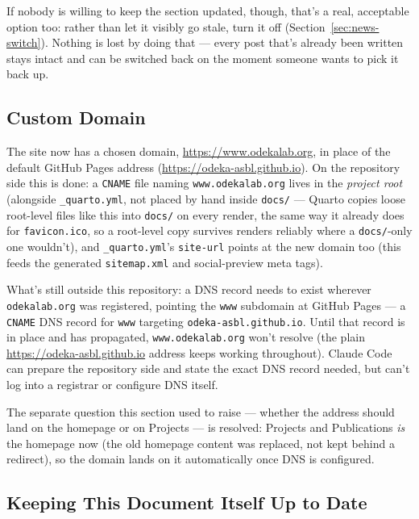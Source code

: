 \documentclass[11pt]{article}
\newcommand{\file}[1]{\texttt{#1}}
\newcommand{\cmd}[1]{\texttt{#1}}
\begin{document}
If nobody is willing to keep the section updated, though, that's a
real, acceptable option too: rather than let it visibly go stale,
turn it off (Section~\ref{sec:news-switch}). Nothing is lost by doing
that --- every post that's already been written stays intact and can be
switched back on the moment someone wants to pick it back up.

\subsection{Custom Domain}
\label{sec:domain-todo}

The site now has a chosen domain, \url{https://www.odekalab.org}, in
place of the default GitHub Pages address
(\url{https://odeka-asbl.github.io}). On the repository side this is
done: a \file{CNAME} file naming \file{www.odekalab.org} lives in the
\emph{project root} (alongside \file{\_quarto.yml}, not placed by
hand inside \file{docs/} --- Quarto copies loose root-level files like
this into \file{docs/} on every render, the same way it already does
for \file{favicon.ico}, so a root-level copy survives renders reliably
where a \file{docs/}-only one wouldn't), and \file{\_quarto.yml}'s
\texttt{site-url} points at the new domain too (this feeds the
generated \file{sitemap.xml} and social-preview meta tags).

What's still outside this repository: a DNS record needs to exist
wherever \file{odekalab.org} was registered, pointing the
\file{www} subdomain at GitHub Pages --- a \cmd{CNAME} DNS record for
\file{www} targeting \file{odeka-asbl.github.io}. Until that record is
in place and has propagated, \file{www.odekalab.org} won't resolve
(the plain \url{https://odeka-asbl.github.io} address keeps working
throughout). Claude Code can prepare the repository side and state the
exact DNS record needed, but can't log into a registrar or configure
DNS itself.

The separate question this section used to raise --- whether the
address should land on the homepage or on Projects --- is resolved:
Projects and Publications \emph{is} the homepage now (the old
homepage content was replaced, not kept behind a redirect), so the
domain lands on it automatically once DNS is configured.

\subsection{Keeping This Document Itself Up to Date}
\label{sec:doc-upkeep}
\end{document}
